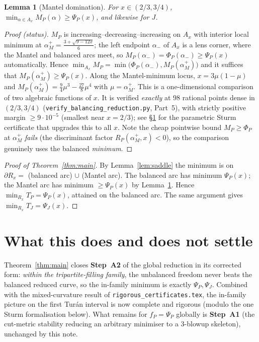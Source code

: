 \documentclass[11pt]{amsart}
\newtheorem{lemma}[theorem]{Lemma}
\theoremstyle{definition}
\begin{document}
\begin{lemma}[Mantel domination]
\label{lem:mantel}
For $x\in(2/3,3/4)$, $\displaystyle\min_{\alpha\in A_x}M_P(\alpha)\ge\Psi_P(x)$,
and likewise for $J$.
\end{lemma}

\begin{proof}[Proof (status)]
$M_P$ is increasing--decreasing--increasing on $A_x$ with interior local
minimum at $\alpha_M^{+}=\tfrac{3+\sqrt{9-12x}}6$; the left endpoint
$\alpha_-$ of $A_x$ is a lens corner, where the Mantel and balanced arcs meet,
so $M_P(\alpha_-)=\Phi_P(\alpha_-)\ge\Psi_P(x)$ automatically.  Hence
$\min_{A_x}M_P=\min\bigl(\Phi_P(\alpha_-),M_P(\alpha_M^{+})\bigr)$ and it
suffices that $M_P(\alpha_M^{+})\ge\Psi_P(x)$.  Along the Mantel-minimum
locus, $x=3\mu(1-\mu)$ and $M_P(\alpha_M^{+})=\tfrac94\mu^3-\tfrac{27}8\mu^4$
with $\mu=\alpha_M^{+}$.  This is a one-dimensional comparison of two
algebraic functions of $x$.  It is verified \emph{exactly} at $98$ rational
points dense in $(2/3,3/4)$ (\texttt{verify\_balancing\_reduction.py},
Part~5), with strictly positive margin $\ge9\cdot10^{-5}$ (smallest near
$x=2/3$); see \S\ref{sec:status} for the parametric Sturm certificate that
upgrades this to all $x$.  Note the cheap pointwise bound $M_P\ge\Phi_P$ at
$\alpha_M^{+}$ \emph{fails} (the discriminant factor $R_P(\alpha_M^{+},x)<0$),
so the comparison genuinely uses the balanced \emph{minimum}.
\end{proof}

\begin{proof}[Proof of Theorem~\ref{thm:main}]
By Lemma~\ref{lem:saddle} the minimum is on $\partial R_x=$ (balanced arc)
$\cup$ (Mantel arc).  The balanced arc has minimum $\Psi_P(x)$; the Mantel arc
has minimum $\ge\Psi_P(x)$ by Lemma~\ref{lem:mantel}.  Hence
$\min_{R_x}T_P=\Psi_P(x)$, attained on the balanced arc.  The same argument
gives $\min_{R_x}T_J=\Psi_J(x)$.
\end{proof}

\section{What this does and does not settle}
\label{sec:status}

Theorem~\ref{thm:main} closes \textbf{Step~A2} of the global reduction in its
corrected form: \emph{within the tripartite-filling family}, the unbalanced
freedom never beats the balanced reduced curve, so the in-family minimum is
exactly $\Psi_P,\Psi_J$.  Combined with the mixed-curvature result of
\texttt{rigorous\_certificates.tex}, the in-family picture on the first
Tur\'an interval is now complete and rigorous (modulo the one Sturm
formalisation below).  What remains for $f_P=\Psi_P$ globally is
\textbf{Step~A1} (the cut-metric stability reducing an arbitrary minimiser to
a $3$-blowup skeleton), unchanged by this note.
\end{document}

